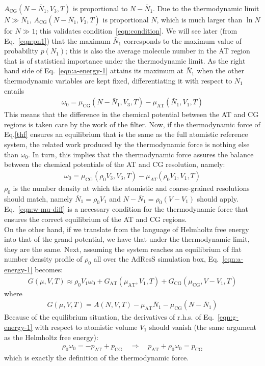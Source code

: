 \documentclass[aip,jcp,a4paper,reprint,onecolumn]{revtex4-1}
\newcommand{\AT}{{\textrm{{AT}}}}
\newcommand{\CG}{{\textrm{CG}}}
\begin{document}
$A_{\CG}(N - \bar N_1, V_3, T)$ is proportional to $N-\bar N_1$.
Due to the thermodynamic limit $N \gg \bar N_1$,
$A_{\CG}(N - \bar N_1, V_3, T)$ is proportional $N$, which
is much larger than $\ln N$ for $N\gg 1$; this
validates condition~\eqref{eqn:condition}.
We will see later (from Eq.~\eqref{eqn:pn1})
that the maximum $\bar N_1$ corresponds to the maximum
value of probability $p(N_1)$; this is also the average molecule
number in the AT region that is of statistical importance
under the thermodynamic limit.
As the right hand side of
Eq.~\eqref{eqn:a-energy-1} attains its maximum at $\bar
N_1$ when the other thermodynamic variables are kept fixed, differentiating it with respect to $N_1$ entails
\begin{align}
  \omega_0 = \mu_{\CG}(N - \bar N_1, V_3, T)  - \mu_{\AT}(\bar N_1, V_1, T)
\end{align}
This means that the difference in the chemical potential between the AT and CG
regions is taken care by the work of the filter.
Now, if the thermodynamic force of Eq.\ref{thf} ensures an
equilibrium that is the same as the full atomistic reference system,
the related work produced by the thermodynamic force is nothing else than $\omega_0 $.
In turn, this implies that the thermodynamic force assures the balance between the chemical potentials of the AT and CG resolution,
namely:
\begin{align}\label{eqn:w-mu-diff}
  \omega_0 = \mu_{\CG}(\rho_0V_3, V_3, T) - \mu_{AT}(\rho_0 V_1, V_1, T)
\end{align}
$\rho_0$ is the number density at which the atomistic and coarse-grained
resolutions should match,
namely $\bar N_1 = \rho_0V_1$ and $N - \bar N_1 = \rho_0(V - V_1)$ should apply.
Eq.~\eqref{eqn:w-mu-diff} is a necessary
condition for the thermodynamic force that ensures
the correct equilibrium of the AT and CG regions.\\

\noindent
On the other hand, if we translate from the language of Helmholtz free
energy into that of the grand potential, we have that
under the thermodynamic limit, they are the same.
Next, assuming the system reaches an
equilibrium of flat number density profile of $\rho_0$ all over the AdResS simulation box, 
Eq.~\eqref{eqn:a-energy-1} becomes:
\begin{align}\label{eqn:g-energy-1}
  G(\mu, V, T) \approx
  \rho_0V_1\omega_0
  + G_{\AT}(\mu_{\AT}, V_1, T) + G_{\CG}(\mu_{\CG}, V - V_1, T)
\end{align}
where
\begin{align}
  G(\mu, V, T) = A(N, V, T) - \mu_{\AT} \bar N_1 - \mu_{\CG}(N - \bar N_1)
\end{align}
Because of the equilibrium situation, the derivatives of r.h.s. of
Eq.~\eqref{eqn:g-energy-1} with respect to atomistic volume $V_1$
should vanish (the same argument as the Helmholtz free energy):
\begin{align}
  \rho_0\omega_0 = -p_{\AT}+p_{\CG} \quad\Longrightarrow\quad
  p_{\AT} + \rho_0\omega_0 = p_{\CG}
\end{align}
which is exactly the definition of the thermodynamic force.
\end{document}

